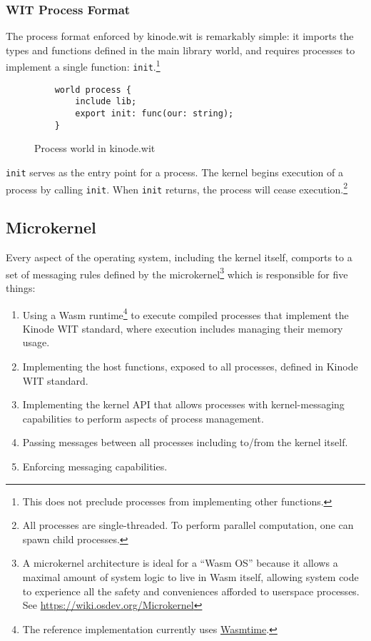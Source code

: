 \documentclass[runningheads]{llncs}
\begin{document}
\subsubsection{WIT Process Format}
\label{sec:oswitprocess}

The process format enforced by kinode.wit is remarkably simple: it imports the types and functions defined in the main library world, and requires processes to implement a single function: \verb|init|.\footnote{This does not preclude processes from implementing other functions.}

\begin{figure}[H]
    \centering
    \begin{verbatim}
    world process {
        include lib;
        export init: func(our: string);
    }
    \end{verbatim}
    \caption{Process world in kinode.wit}
    \label{fig:Process world}
\end{figure}

\verb|init| serves as the entry point for a process.
The kernel begins execution of a process by calling \verb|init|.
When \verb|init| returns, the process will cease execution.\footnote{All processes are single-threaded. To perform parallel computation, one can spawn child processes.}

\subsection{Microkernel}
\label{sec:osmicrokernel}

Every aspect of the operating system, including the kernel itself, comports to a set of messaging rules defined by the microkernel\footnote{A microkernel architecture is ideal for a ``Wasm OS'' because it allows a maximal amount of system logic to live in Wasm itself, allowing system code to experience all the safety and conveniences afforded to userspace processes. See \url{https://wiki.osdev.org/Microkernel}} which is responsible for five things:
\begin{enumerate}
    \item Using a Wasm runtime\footnote{The reference implementation currently uses \href{https://wasmtime.dev}{Wasmtime}.}
    to execute compiled processes that implement the Kinode WIT standard, where execution includes managing their memory usage.
    \item Implementing the host functions, exposed to all processes, defined in Kinode WIT standard.
    \item Implementing the kernel API that allows processes with kernel-messaging capabilities to perform aspects of process management.
    \item Passing messages between all processes including to/from the kernel itself.
    \item Enforcing messaging capabilities.
\end{enumerate}
\end{document}
